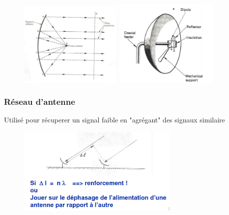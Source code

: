 		\begin{figure}[htp]
			\centering
			\includegraphics[width=0.45\textwidth]{img/parabole.png}
			\includegraphics[width=0.45\textwidth]{img/parabole2.png}
		\end{figure}
	\subsubsection{Réseau d'antenne}
		Utilisé pour récuperer un signal faible en "agrégant" des signaux similaire
		\begin{figure}[htp]
			\centering
			\includegraphics[width=0.7\textwidth]{img/reseauAntennes.png}
		\end{figure}
